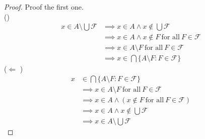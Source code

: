 \begin{proof}
    Proof the first one.\\
    (\implies )\\
    \begin{align*}
        x \in A \setminus \bigcup \mathcal{F} &\implies x \in A \land x \notin \bigcup \mathcal{F}\\
        &\implies x \in A \land x \notin F \ \text{for all}\   F \in \mathcal{F}\\
        &\implies x \in A \setminus F \ \text{for all}\ F \in \mathcal{F}\\ 
        &\implies x \in \bigcap \{A \setminus F : F \in \mathcal{F}\}
    \end{align*}
    ($\Leftarrow$ )\\
    \begin{align*}
        x &\in \bigcap \{A \setminus F : F \in \mathcal{F}\}\\
        &\implies  x \in A \setminus F \ \text{for all}\ F \in \mathcal{F}\\
        &\implies  x \in A \land (x \notin F \ \text{for all}\ F \in \mathcal{F})\\
        &\implies  x \in A \land x \notin \bigcup \mathcal{F}\\
        &\implies x \in A \setminus \bigcup \mathcal{F}
    \end{align*}

\end{proof}

    
\newpage
